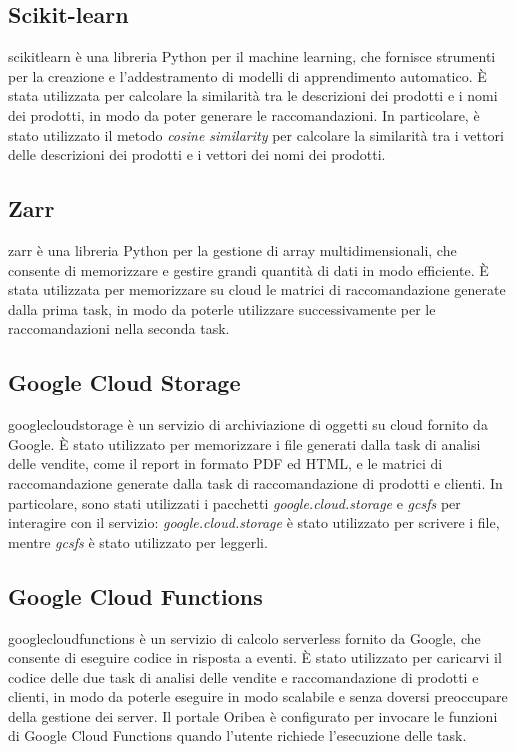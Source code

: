 \subsection{Scikit-learn}
\gls{scikitlearn} è una libreria Python per il machine learning, che fornisce strumenti per la creazione e l'addestramento di modelli di apprendimento automatico. È stata utilizzata per calcolare la similarità tra le descrizioni dei prodotti e i nomi dei prodotti, in modo da poter generare le raccomandazioni. In particolare, è stato utilizzato il metodo \emph{cosine similarity} per calcolare la similarità tra i vettori delle descrizioni dei prodotti e i vettori dei nomi dei prodotti.

\subsection{Zarr}
\gls{zarr} è una libreria Python per la gestione di array multidimensionali, che consente di memorizzare e gestire grandi quantità di dati in modo efficiente. È stata utilizzata per memorizzare su cloud le matrici di raccomandazione generate dalla prima task, in modo da poterle utilizzare successivamente per le raccomandazioni nella seconda task.

\subsection{Google Cloud Storage}
\gls{googlecloudstorage} è un servizio di archiviazione di oggetti su cloud fornito da Google. È stato utilizzato per memorizzare i file generati dalla task di analisi delle vendite, come il report in formato PDF ed HTML, e le matrici di raccomandazione generate dalla task di raccomandazione di prodotti e clienti. In particolare, sono stati utilizzati i pacchetti \emph{google.cloud.storage} e \emph{gcsfs} per interagire con il servizio: \emph{google.cloud.storage} è stato utilizzato per scrivere i file, mentre \emph{gcsfs} è stato utilizzato per leggerli.

\subsection{Google Cloud Functions}
\gls{googlecloudfunctions} è un servizio di calcolo serverless fornito da Google, che consente di eseguire codice in risposta a eventi. È stato utilizzato per caricarvi il codice delle due task di analisi delle vendite e raccomandazione di prodotti e clienti, in modo da poterle eseguire in modo scalabile e senza doversi preoccupare della gestione dei server. Il portale Oribea è configurato per invocare le funzioni di Google Cloud Functions quando l'utente richiede l'esecuzione delle task.

